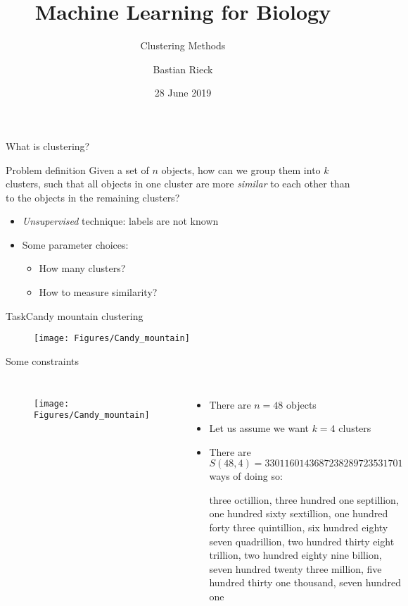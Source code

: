 \documentclass[aspectratio=169]{beamer}
\title{Machine Learning for Biology}
\subtitle{Clustering Methods}
\author{Bastian Rieck}
\institute{%
}
\date{28 June 2019}
\begin{document}
  \begin{frame}{What is clustering?}

    \begin{block}{Problem definition}
      Given a set of $n$ objects, how can we group them into $k$
      clusters, such that all objects in one cluster are more
      \emph{similar} to each other than to the objects in the
      remaining clusters?
    \end{block}

    \vfill

    \begin{itemize}
      \item \emph{Unsupervised} technique: labels are not known
      \item Some parameter choices:
        \begin{itemize}
          \item How many clusters?
          \item How to measure similarity?
        \end{itemize}
    \end{itemize}
  \end{frame}

  \begin{frame}{Task}{Candy mountain clustering}
    \begin{figure}
      \texttt{[image: Figures/Candy\_mountain]}
    \end{figure}
  \end{frame}

  \begin{frame}{Some constraints}
    \begin{columns}
        \begin{figure}
          \texttt{[image: Figures/Candy\_mountain]}
        \end{figure}
        \begin{itemize}
          \item There are $n = 48$ objects
          \item Let us assume we want $k = 4$ clusters
          \item There are $S(48, 4) = 3301160143687238289723531701$ ways
            of doing so:
            \begin{scriptsize}
              three octillion, three hundred one septillion, one hundred
              sixty sextillion, one hundred forty three quintillion, six
              hundred eighty seven quadrillion, two hundred thirty eight
              trillion, two hundred eighty nine billion, seven hundred
              twenty three million, five hundred thirty one thousand,
              seven hundred one
            \end{scriptsize}
        \end{itemize}
    \end{columns}
  \end{frame}
\end{document}
